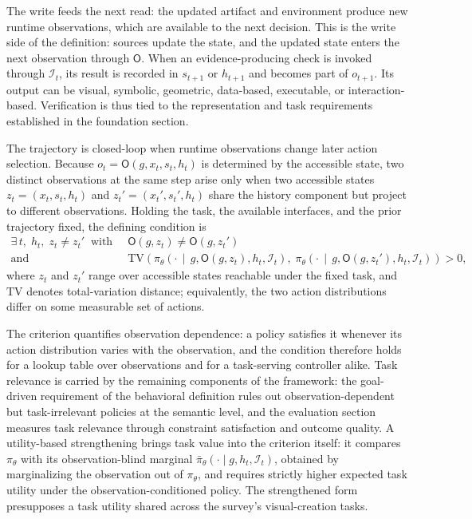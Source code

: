 The write feeds the next read: the updated artifact and environment produce new runtime observations, which are available to the next decision. This is the write side of the definition: sources update the state, and the updated state enters the next observation through $\mathsf{O}$. When an evidence-producing check is invoked through $\mathcal{I}_t$, its result is recorded in $s_{t+1}$ or $h_{t+1}$ and becomes part of $o_{t+1}$. Its output can be visual, symbolic, geometric, data-based, executable, or interaction-based. Verification is thus tied to the representation and task requirements established in the foundation section.

The trajectory is closed-loop when runtime observations change later action selection. Because $o_t=\mathsf{O}(g,x_t,s_t,h_t)$ is determined by the accessible state, two distinct observations at the same step arise only when two accessible states $z_t=(x_t,s_t,h_t)$ and $z_t'=(x_t',s_t',h_t)$ share the history component but project to different observations. Holding the task, the available interfaces, and the prior trajectory fixed, the defining condition is
\begin{equation}
\begin{aligned}
  \exists\,t,\;h_t,\;z_t\neq z_t'
  \;\;\text{with}\;\;
  &\mathsf{O}(g,z_t)\neq\mathsf{O}(g,z_t')\\
  \text{and}\;\;
  &\mathrm{TV}\!\left(
     \pi_{\theta}\!\left(\cdot\,\middle|\,g,\mathsf{O}(g,z_t),h_t,\mathcal{I}_t\right),\;
     \pi_{\theta}\!\left(\cdot\,\middle|\,g,\mathsf{O}(g,z_t'),h_t,\mathcal{I}_t\right)
   \right) > 0,
\end{aligned}
\end{equation}
where $z_t$ and $z_t'$ range over accessible states reachable under the fixed task, and $\mathrm{TV}$ denotes total-variation distance; equivalently, the two action distributions differ on some measurable set of actions.

The criterion quantifies observation dependence: a policy satisfies it whenever its action distribution varies with the observation, and the condition therefore holds for a lookup table over observations and for a task-serving controller alike. Task relevance is carried by the remaining components of the framework: the goal-driven requirement of the behavioral definition rules out observation-dependent but task-irrelevant policies at the semantic level, and the evaluation section measures task relevance through constraint satisfaction and outcome quality. A utility-based strengthening brings task value into the criterion itself: it compares $\pi_{\theta}$ with its observation-blind marginal $\bar{\pi}_{\theta}(\cdot\mid g,h_t,\mathcal{I}_t)$, obtained by marginalizing the observation out of $\pi_{\theta}$, and requires strictly higher expected task utility under the observation-conditioned policy. The strengthened form presupposes a task utility shared across the survey's visual-creation tasks.

